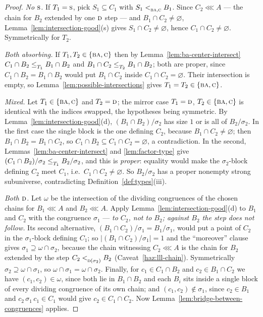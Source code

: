 \begin{proof}
\emph{No $\textup{\textsc{s}}$.} If $T_{1}=\textup{\textsc{s}}$, pick $S_{1}\subseteq C_{1}$ with
$S_{1}<_{\textup{\textsc{ba}},\textup{\textsc{c}}}^{}B_{1}$. Since $C_{2}\lll A$ --- the chain for $B_{2}$
extended by one $\textup{\textsc{d}}$ step --- and $B_{1}\cap C_{2}\neq\varnothing$,
Lemma~\ref{lem:intersection-good}(s) gives $S_{1}\cap C_{2}\neq\varnothing$,
hence $C_{1}\cap C_{2}\neq\varnothing$. Symmetrically for $T_{2}$.

\emph{Both absorbing.} If $T_{1},T_{2}\in\{\textup{\textsc{ba}},\textup{\textsc{c}}\}$ then by
Lemma~\ref{lem:ba-center-intersect} $C_{1}\cap B_{2}\le_{T_{1}}^{}B_{1}\cap
B_{2}$ and $B_{1}\cap C_{2}\le_{T_{2}}^{}B_{1}\cap B_{2}$; both are proper,
since $C_{1}\cap B_{2}=B_{1}\cap B_{2}$ would put $B_{1}\cap C_{2}$ inside
$C_{1}\cap C_{2}=\varnothing$. Their intersection is empty, so
Lemma~\ref{lem:possible-intersections} gives $T_{1}=T_{2}\in\{\textup{\textsc{ba}},\textup{\textsc{c}}\}$.

\emph{Mixed.} Let $T_{1}\in\{\textup{\textsc{ba}},\textup{\textsc{c}}\}$ and $T_{2}=\textup{\textsc{d}}$; the mirror case
$T_{1}=\textup{\textsc{d}}$, $T_{2}\in\{\textup{\textsc{ba}},\textup{\textsc{c}}\}$ is identical with the indices swapped, the
hypotheses being symmetric. By
Lemma~\ref{lem:intersection-good}(d), $(B_{1}\cap B_{2})/\sigma_{2}$ has size
$1$ or is all of $B_{2}/\sigma_{2}$. In the first case the single block is the
one defining $C_{2}$, because $B_{1}\cap C_{2}\neq\varnothing$; then
$B_{1}\cap B_{2}=B_{1}\cap C_{2}$, so $C_{1}\cap B_{2}\subseteq C_{1}\cap
C_{2}=\varnothing$, a contradiction. In the second,
Lemmas~\ref{lem:ba-center-intersect} and \ref{lem:factor-type} give
$(C_{1}\cap B_{2})/\sigma_{2}\le_{T_{1}}^{}B_{2}/\sigma_{2}$, and this is
\emph{proper}: equality would make the $\sigma_{2}$-block defining $C_{2}$ meet
$C_{1}$, i.e.\ $C_{1}\cap C_{2}\neq\varnothing$. So $B_{2}/\sigma_{2}$ has a
proper nonempty strong subuniverse, contradicting
Definition~\ref{def:types}(iii).

\emph{Both $\textup{\textsc{d}}$.} Let $\omega$ be the intersection of the dividing congruences
of the chosen chains for $B_{1}\lll A$ and $B_{2}\lll A$. Apply
Lemma~\ref{lem:intersection-good}(d) to $B_{1}$ and $C_{2}$ with the congruence
$\sigma_{1}$ --- \emph{to $C_{2}$, not to $B_{2}$; against $B_{2}$ the step does
not follow.} Its second alternative, $(B_{1}\cap C_{2})/\sigma_{1}=B_{1}/
\sigma_{1}$, would put a point of $C_{2}$ in the $\sigma_{1}$-block defining
$C_{1}$; so $|(B_{1}\cap C_{2})/\sigma_{1}|=1$ and the ``moreover'' clause
gives $\sigma_{1}\supseteq\omega\cap\sigma_{2}$, because the chain witnessing
$C_{2}\lll A$ is the chain for $B_{2}$ extended by the step
$C_{2}<_{\textup{\textsc{d}}(\sigma_{2})}^{}B_{2}$ (Caveat~\ref{haz:lll-chain}). Symmetrically
$\sigma_{2}\supseteq\omega\cap\sigma_{1}$, so
$\omega\cap\sigma_{1}=\omega\cap\sigma_{2}$. Finally, for $c_{1}\in C_{1}\cap
B_{2}$ and $c_{2}\in B_{1}\cap C_{2}$ we have $(c_{1},c_{2})\in\omega$, since
both lie in $B_{1}\cap B_{2}$ and each $B_{i}$ sits inside a single block of
every dividing congruence of its own chain; and $(c_{1},c_{2})\notin\sigma_{1}$,
since $c_{2}\in B_{1}$ and $c_{2}\,\sigma_{1}\,c_{1}\in C_{1}$ would give
$c_{2}\in C_{1}\cap C_{2}$. Now Lemma~\ref{lem:bridge-between-congruences}
applies.
\end{proof}

